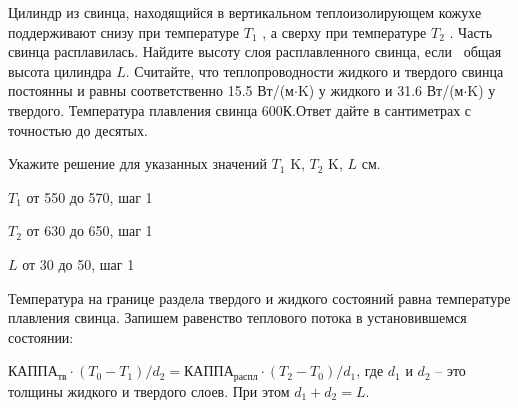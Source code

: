 
Цилиндр из свинца, находящийся в вертикальном теплоизолирующем кожухе поддерживают снизу при температуре  
$T_1$ , а сверху при температуре  $T_2$ . Часть свинца расплавилась. Найдите высоту слоя расплавленного свинца, 
если  общая высота цилиндра $L$. Считайте, что теплопроводности жидкого и твердого свинца постоянны и 
равны соответственно 15.5 Вт/(м$\cdot$K) у жидкого и 31.6 Вт/(м$\cdot$K) у твердого. 
Температура плавления свинца 600К.Ответ дайте в сантиметрах с точностью до десятых.

Укажите решение для указанных значений $T_1$ K, $T_2$ K, $L$ см.

\paramSection

$T_1$ от 550 до 570, шаг 1

$T_2$ от 630 до 650, шаг 1

$L$ от 30 до 50, шаг 1

\solutionSection

Температура на границе раздела твердого и жидкого состояний равна температуре плавления свинца. 
Запишем равенство теплового потока в установившемся состоянии:

$\text{КАППА}_{\text{тв}} \cdot (T_0-T_1)/d_2 = \text{КАППА}_{\text{распл}} \cdot (T_2-T_0)/d_1$, 
где $d_1$ и $d_2$ – это толщины жидкого и твердого слоев. При этом $d_1+d_2 = L$.

